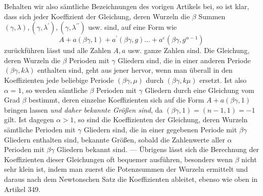 Behalten wir also sämtliche Bezeichnungen des vorigen Artikels bei, so ist klar, dass sich jeder Koeffizient der Gleichung, deren Wurzeln die \(\beta\) Summen \((\gamma,\lambda),\allowbreak (\gamma,\lambda^{\prime}),\allowbreak (\gamma,\lambda^{\prime\prime})\) usw. sind, auf eine Form wie \[A+a(\beta\gamma,1)+a^{\prime}(\beta\gamma,g)\ldots+a^\varepsilon(\beta\gamma,g^{\alpha-1})\] zurückführen lässt und alle Zahlen \(A,\allowbreak a\) usw. ganze Zahlen sind. Die Gleichung, deren Wurzeln die \(\beta\) Perioden mit \(\gamma\) Gliedern sind, die in einer anderen Periode \((\beta\gamma,k\lambda)\) enthalten sind, geht aus jener hervor, wenn man überall in den Koeffizienten jede beliebige Periode \((\beta\gamma,\mu)\) durch \((\beta\gamma,k\mu)\) ersetzt. Ist also \(\alpha=1\), so werden sämtliche \(\beta\) Perioden mit \(\gamma\) Gliedern durch eine Gleichung vom Grad \(\beta\) bestimmt, deren einzelne Koeffizienten sich auf die Form \(A+a(\beta\gamma,1)\) bringen lassen \textit{und daher bekannte Größen sind}, da \((\beta\gamma,1)=(n-1,1)=-1\) gilt. Ist dagegen \(\alpha>1\), so sind die Koeffizienten der Gleichung, deren Wurzeln sämtliche Perioden mit \(\gamma\) Gliedern sind, die in einer gegebenen Periode mit \(\beta\gamma\) Gliedern enthalten sind, bekannte Größen, sobald die Zahlenwerte aller \(\alpha\) Perioden mit \(\beta\gamma\) Gliedern bekannt sind. — Übrigens lässt sich die Berechnung der Koeffizienten dieser Gleichungen oft bequemer ausführen, besonders wenn \(\beta\) nicht sehr klein ist, indem man zuerst die Potenzsummen der Wurzeln ermittelt und daraus nach dem Newtonschen Satz die Koeffizienten ableitet, ebenso wie oben in Artikel 349.

